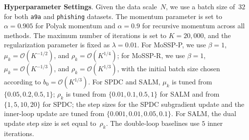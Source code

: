 \documentclass{article}
\theoremstyle{plain}
\theoremstyle{definition}
\theoremstyle{remark}
\newcommand{\calO}{\mathcal{O}}
\numberwithin{equation}{section}
\begin{document}
\noindent\textbf{Hyperparameter Settings}.
Given the data scale~$N$, we use a batch size of~$32$ for both
\texttt{a9a} and \texttt{phishing} datasets. The momentum parameter is set to
$\alpha=0.905$ for Polyak momentum and $\alpha=0.9$ for recursive
momentum across all methods. The maximum number of iterations is set to
$K=20{,}000$, and the regularization parameter is fixed as
$\lambda=0.01$. For MoSSP-P, we use $\beta=1$,
$\mu_k=\calO(K^{-1/2})$, and $\rho_k=\calO(K^{1/4})$; for
MoSSP-R, we use $\beta=1$, $\mu_k=\calO(K^{-1/3})$, and
$\rho_k=\calO(K^{1/3})$, with the initial batch size chosen according
to $b_0=\calO(K^{1/3})$. For SPDC and SALM, $\mu_k$ is tuned from
$\{0.05,0.2,0.5,1\}$; $\rho_k$ is tuned from $\{0.01,0.1,0.5,1\}$ for
SALM and from $\{1,5,10,20\}$ for SPDC; the step sizes for the SPDC
subgradient update and the inner-loop update are tuned from
$\{0.001,0.01,0.05,0.1\}$. For SALM, the dual update step size is set
equal to~$\rho_k$. The double-loop baselines use $5$ inner iterations.
\end{document}
